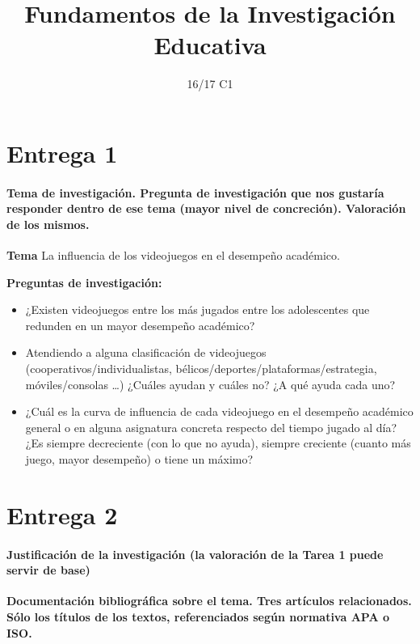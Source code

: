 \documentclass[palatino,nochap]{apuntesURJC}
\title{Fundamentos de la Investigación Educativa}
\author{}
\date{16/17 C1}
\begin{document}
\pagestyle{plain}
\maketitle

\tableofcontents
\newpage

\section{Entrega 1}

\paragraph{Tema de investigación. 
%
Pregunta de investigación que nos gustaría responder dentro de ese tema (mayor nivel de concreción).
%
Valoración de los mismos.}

\textbf{Tema} La influencia de los videojuegos en el desempeño académico.

\textbf{Preguntas de investigación: }

\begin{itemize}
\item ¿Existen videojuegos entre los más jugados entre los adolescentes que redunden en un mayor desempeño académico?
\item Atendiendo a alguna clasificación de videojuegos (cooperativos/individualistas, bélicos/deportes/plataformas/estrategia, móviles/consolas …) ¿Cuáles ayudan y cuáles no? ¿A qué ayuda cada uno? 
\item ¿Cuál es la curva de influencia de cada videojuego en el desempeño académico general o en alguna asignatura concreta respecto del tiempo jugado al día? ¿Es siempre decreciente (con lo que no ayuda), siempre creciente (cuanto más juego, mayor desempeño) o tiene un máximo? 
\end{itemize}



\section{Entrega 2}

\paragraph{Justificación de la investigación (la valoración de la Tarea 1 puede servir de base)\\}
\textbf{Documentación bibliográfica sobre el tema.
%
Tres artículos relacionados. 
%
Sólo los títulos de los textos, referenciados según normativa APA o ISO.}
\end{document}
